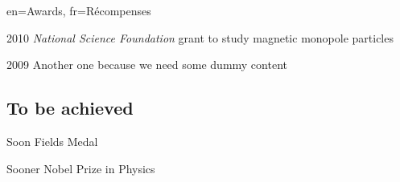 \documentclass[letter]{article}
\begin{document}
\begin{section}{en={Awards}, 
              fr={R\'ecompenses}}

    \item{2010} {\textit{National Science Foundation} grant to study magnetic monopole particles}
    \item{2009} {Another one because we need some dummy content}

\subsection{To be achieved}
    \item{Soon}     {Fields Medal}
    \item{Sooner}   {Nobel Prize in Physics}
\end{section}
\end{document}
